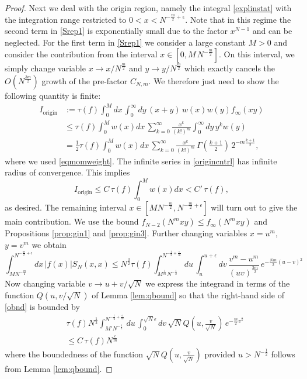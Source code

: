 \documentclass[11pt,reqno]{amsproc}
\numberwithin{equation}{section}
\numberwithin{theorem}{section}
\begin{document}
\begin{proof}
Next we deal with the origin region, namely the integral \eqref{explinstat} with the integration range restricted to $0 < x <  N^{-\frac{m}{2}+\epsilon}$. Note that in this regime the second term in \eqref{Srep1} is exponentially small due to the factor $x^{N-1}$ and can be neglected. For the first term in \eqref{Srep1} we consider a large constant $M>0$ and consider the contribution from the interval $x \in [0,M\,N^{-\frac{m}{2}}]$. On this interval, we simply change variable $x \to x/N^{\frac{m}{2}}$ and $y \to y/N^{\frac{m}{2}}$ which exactly cancels the $O(N^{\frac{3m}{2}})$ growth of the pre-factor $C_{N,m}$. We therefore just need to show the following quantity is finite:
\begin{align}
I_{\mathrm{origin}} &:= \tau(f)\int_{0}^{M}dx\,\int_{0}^{\infty}dy\,(x+y)\,w(x)w(y)f_{\infty}(xy)\\
&\leq \tau(f)\int_{0}^{M}w(x)dx\,\sum_{k=0}^{\infty}\frac{x^{k}}{(k!)^{m}}\int_{0}^{\infty}dy\,y^{k}w(y)\\
&= \frac{1}{2}\tau(f)\int_{0}^{M}w(x)dx\,\sum_{k=0}^{\infty}\frac{x^{k}}{(k!)^{m}}\,\Gamma\left(\frac{k+1}{2}\right)\,2^{-m\frac{k+1}{2}}, \label{origincntrl}
\end{align}
where we used \eqref{eqmomweight}. The infinite series in \eqref{origincntrl} has infinite radius of convergence. This implies 
\begin{equation}
I_{\mathrm{origin}} \leq C\,\tau(f)\int_{0}^{M}w(x)dx < C'\,\tau(f),
\end{equation}
as desired. The remaining interval $x \in [MN^{-\frac{m}{2}},N^{-\frac{m}{2}+\epsilon}]$ will turn out to give the main contribution. We use the bound $f_{N-2}(N^{m}xy) \leq f_{\infty}(N^{m}xy)$ and Propositions \ref{prop:gin1} and \ref{prop:gin3}. Further changing variables $x=u^{m}$, $y=v^{m}$ we obtain
\begin{equation}
\int_{MN^{-\frac{m}{2}}}^{N^{-\frac{m}{2}+\epsilon}}dx\,|f(x)|S_{N}(x,x) \leq N^{\frac{3}{2}}\tau(f)\int_{M^{\frac{1}{m}}N^{-\frac{1}{2}}}^{N^{-\frac{1}{2}+\frac{\epsilon}{m}}}du\,\int_{u}^{u+\epsilon}dv\,\frac{v^{m}-u^{m}}{(uv)^{\frac{3m}{2}}}\,e^{-\frac{Nm}{2}(u-v)^{2}} \label{obnd}
\end{equation}
Now changing variable $v \to u+v/\sqrt{N}$ we express the integrand in terms of the function $Q(u,v/\sqrt{N})$ of Lemma \ref{lem:qbound} so that the right-hand side of \eqref{obnd} is bounded by
\begin{align}
&\tau(f)N^{\frac{1}{2}}\int_{M'N^{-\frac{1}{2}}}^{N^{-\frac{1}{2}+\frac{\epsilon}{m}}}du\,\int_{0}^{\sqrt{N}\epsilon}dv\,\sqrt{N}Q\left(u,\frac{v}{\sqrt{N}}\right)\,e^{-\frac{m}{2}v^{2}}\\
&\leq C\,\tau(f)N^{\frac{\epsilon}{m}}	
\end{align}
where the boundedness of the function $\sqrt{N}Q\left(u,\frac{v}{\sqrt{N}}\right)$ provided $u > N^{-\frac{1}{2}}$ follows from Lemma \ref{lem:qbound}. 
\end{proof}
\end{document}
